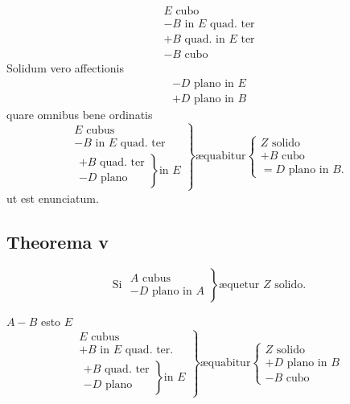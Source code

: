\documentclass[11pt,a4paper]{article}
\begin{document}
\[ \begin{array}{l} E \text{ cubo} \\ - B \text{ in } E \text{ quad. ter} \\ + B \text{ quad. in } E \text{ ter} \\ - B \text{ cubo} \end{array} \]
Solidum vero affectionis
\[ \begin{array}{l} - D \text{ plano in } E \\ + D \text{ plano in } B \end{array} \]
quare omnibus bene ordinatis
\[ \left.\begin{array}{l} E \text{ cubus} \\ - B \text{ in } E \text{ quad. ter} \\ \left.\begin{array}{l} + B \text{ quad. ter} \\ - D \text{ plano} \end{array}\right\} \text{in } E \end{array}\right\} \text{æquabitur} \left\{\begin{array}{l} Z \text{ solido} \\ + B \text{ cubo} \\ = D \text{ plano in } B. \end{array}\right. \]
ut est enunciatum.

\subsection*{Theorema v}

\[ \text{Si } \left.\begin{array}{l} A \text{ cubus} \\ - D \text{ plano in } A \end{array}\right\} \text{æquetur } Z \text{ solido.} \]

$A - B$ esto $E$
\[ \left.\begin{array}{l} E \text{ cubus} \\ + B \text{ in } E \text{ quad. ter.} \\ \left.\begin{array}{l} + B \text{ quad. ter} \\ - D \text{ plano} \end{array}\right\} \text{in } E \end{array}\right\} \text{æquabitur} \left\{\begin{array}{l} Z \text{ solido} \\ + D \text{ plano in } B \\ - B \text{ cubo} \end{array}\right. \]
\end{document}
